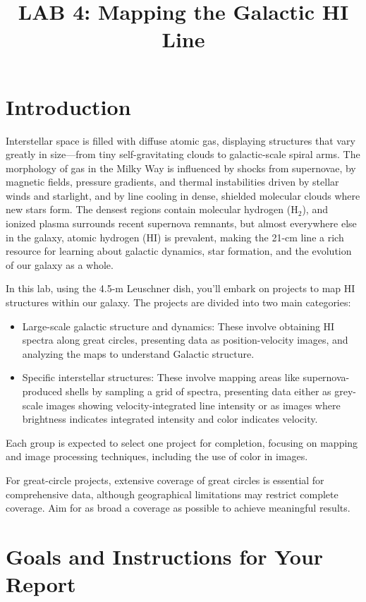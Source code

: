 \documentclass[psfig,preprint]{aastex}
\begin{document}

\title{LAB 4: Mapping the Galactic HI Line}

\tableofcontents


\section{Introduction}

\noindent
Interstellar space is filled with diffuse atomic gas, displaying
structures that vary greatly in size---from tiny self-gravitating clouds
to galactic-scale spiral arms.
The morphology of gas in the Milky Way is influenced
by shocks from supernovae, by
magnetic fields, pressure gradients, and thermal instabilities driven by stellar winds and
starlight, and by line cooling in dense, shielded molecular clouds where new stars form.
The densest regions contain molecular hydrogen (H$_2$), and ionized plasma surrounds
recent supernova remnants, but almost everywhere else in the galaxy,
atomic hydrogen (HI) is prevalent, making the 21-cm line a rich resource for
learning about galactic dynamics, star formation, and the evolution of our galaxy as a whole.

In this lab, using the 4.5-m Leuschner dish, you'll embark on projects to map HI structures within our galaxy. The projects are divided into two main categories:
\begin{itemize}
    \item Large-scale galactic structure and dynamics: These involve obtaining HI spectra along great circles, presenting data as position-velocity images, and analyzing the maps to understand Galactic structure.
    \item Specific interstellar structures: These involve mapping areas like supernova-produced shells by sampling a grid of spectra, presenting data either as grey-scale images showing velocity-integrated line intensity or as images where brightness indicates integrated intensity and color indicates velocity.
\end{itemize}
\noindent
Each group is expected to select one project for completion, focusing on mapping and image processing techniques, including the use of color in images.

For great-circle projects, extensive coverage of great circles is essential for comprehensive data, although geographical limitations may restrict complete coverage. Aim for as broad a coverage as possible to achieve meaningful results.

\section{Goals and Instructions for Your Report}
\end{document}
